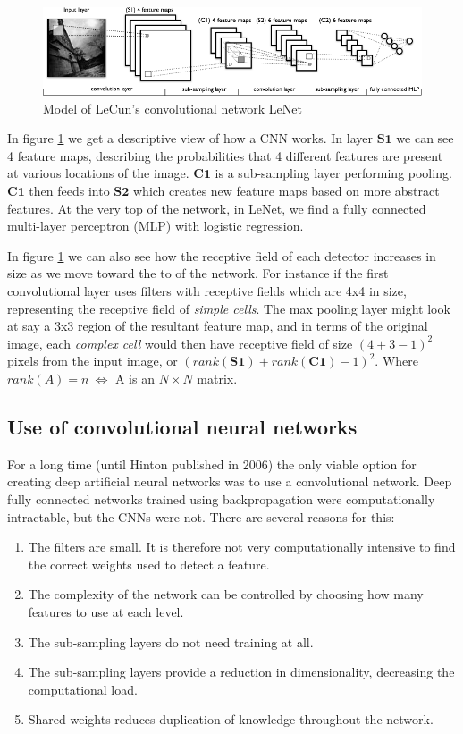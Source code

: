 \documentclass[11pt]{article}
\begin{document}
\begin{figure}[htb]
  \centering
  \includegraphics[width=\textwidth]{mylenet.png}
  \caption{Model of LeCun's convolutional network LeNet}
  \label{fig:mylenet}
\end{figure}

In figure \ref{fig:mylenet} we get a descriptive view of how a CNN works.  In layer $\mathbf{S1}$ we can see 4 feature maps, describing the probabilities that 4 different features are present at various locations of the image.  $\mathbf{C1}$ is a sub-sampling layer performing pooling.  $\mathbf{C1}$ then feeds into $\mathbf{S2}$ which creates new feature maps based on more abstract features.  At the very top of the network, in LeNet, we find a fully connected multi-layer perceptron (MLP) with logistic regression.

In figure \ref{fig:mylenet} we can also see how the receptive field of each detector increases in size as we move toward the to of the network.  For instance if the first convolutional layer uses filters with receptive fields which are 4x4 in size, representing the receptive field of \textit{simple cells}.  The max pooling layer might look at say a 3x3 region of the resultant feature map, and in terms of the original image, each \textit{complex cell} would then have receptive field of size $(4 + 3 - 1)^2$ pixels from the input image, or $(rank(\mathbf{S1}) + rank(\mathbf{C1}) - 1)^2$.  Where $rank(A) = n\ \Leftrightarrow$ A is an $N\times N$ matrix.

\subsection{Use of convolutional neural networks}

For a long time (until Hinton published \cite{hinton06} in 2006) the only viable option for creating deep artificial neural networks was to use a convolutional network.  Deep fully connected networks trained using backpropagation were computationally intractable, but the CNNs were not.  There are several reasons for this:

\begin{enumerate}
\item The filters are small.  It is therefore not very computationally intensive to find the correct weights used to detect a feature.
\item The complexity of the network can be controlled by choosing how many features to use at each level.
\item The sub-sampling layers do not need training at all.
\item The sub-sampling layers provide a reduction in dimensionality, decreasing the computational load.
\item Shared weights reduces duplication of knowledge throughout the network.
\end{enumerate}
\end{document}
